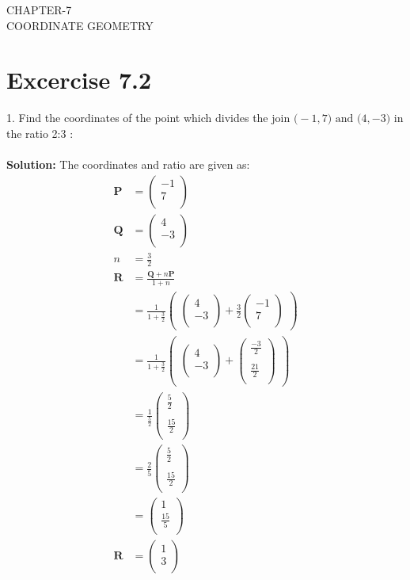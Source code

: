 \documentclass[12pt]{article}
\newcommand{\solution}{\noindent \textbf{Solution: }}
\newcommand{\myvec}[1]{\ensuremath{\begin{pmatrix}#1\end{pmatrix}}}
\let\vec\mathbf
\begin{document}
\begin{center}
\textbf\large{CHAPTER-7 \\ COORDINATE GEOMETRY}
\end{center}
\section*{Excercise 7.2}

1. Find the coordinates of the point which divides the join $\vec(-1,7) \text{ and } \vec(4,-3)$ in the ratio 2:3 :
\\
\\
\solution		
The coordinates and ratio are given as:
\begin{align}
\vec{P}&=\myvec{-1\\7\\}\\ 
\vec{Q}&=\myvec{4\\-3\\}\\ 
n&=\frac{3}{2}
\\
\vec{R}&=\frac{\vec{Q}+n\vec{P}}{1+n}\\
&=\frac{1}{1+\frac{3}{2}}  \myvec{\myvec{
4\\
-3\\
}
  +
   \frac{3}{2}\myvec{
-1\\
7\\
}}\\
	&= \frac{1}{1+\frac{3}{2}} \myvec{\myvec{
4\\
-3\\
}
  +
  \myvec{
	  \frac{-3}{2}\\
	  \\
	\frac{21}{2}\\
}} \\
	&=\frac{1}{\frac{5}{2}} 
	\myvec{
	\frac{5}{2}\\
	\\
	\frac{15}{2}\\
}\\
	&=\frac{2}{5}
        \myvec{
          \frac{5}{2}\\
	  \\
	\frac{15}{2}\\
  }\\
	&=\myvec{
1\\
	\frac{15}{5}\\
}\\
	\vec{R}&=\myvec{
        1\\
        3\\
  }
\end{align}
\end{document}
